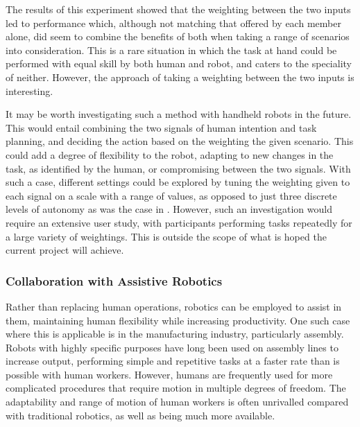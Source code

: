 \documentclass[11pt]{article}
\begin{document}
The results of this experiment showed that the weighting between the two inputs led to performance which, although not matching that offered by each member alone, did seem to combine the benefits of both when taking a range of scenarios into consideration. This is a rare situation in which the task at hand could be performed with equal skill by both human and robot, and caters to the speciality of neither. However, the approach of taking a weighting between the two inputs is interesting. 

It may be worth investigating such a method with handheld robots in the future. This would entail combining the two signals of human intention and task planning, and deciding the action based on the weighting the given scenario. This could add a degree of flexibility to the robot, adapting to new changes in the task, as identified by the human, or compromising between the two signals. With such a case, different settings could be explored by tuning the weighting given to each signal on a scale with a range of values, as opposed to just three discrete levels of autonomy as was the case in \cite{GreggSmithDesign}. However, such an investigation would require an extensive user study, with participants performing tasks repeatedly for a large variety of weightings. This is outside the scope of what is hoped the current project will achieve.

\subsubsection{Collaboration with Assistive Robotics}
Rather than replacing human operations, robotics can be employed to assist in them, maintaining human flexibility while increasing productivity. One such case where this is applicable is in the manufacturing industry, particularly assembly. Robots with highly specific purposes have long been used on assembly lines to increase output, performing simple and repetitive tasks at a faster rate than is possible with human workers. However, humans are frequently used for more complicated procedures that require motion in multiple degrees of freedom. The adaptability and range of motion of human workers is often unrivalled compared with traditional robotics, as well as being much more available. 
\end{document}
